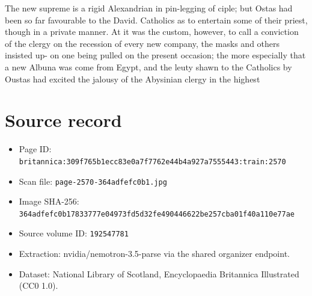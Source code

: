 \documentclass{article}
\begin{document}
The new supreme is a rigid Alexandrian in pin-legging of ciple; but Ostas had been so far favourable to the David. Catholics as to entertain some of their priest, though in a private manner. At it was the custom, however, to call a conviction of the clergy on the recession of every new company, the masks and others insisted up- on one being pulled on the present occasion; the more especially that a new Albuna was come from Egypt, and the leuty shawn to the Catholics by Oustas had excited the jalousy of the Abysinian clergy in the highest

\section*{Source record}
\begin{itemize}
\item Page ID: \texttt{britannica:309f765b1ecc83e0a7f7762e44b4a927a7555443:train:2570}
\item Scan file: \texttt{page-2570-364adfefc0b1.jpg}
\item Image SHA-256: \texttt{364adfefc0b17833777e04973fd5d32fe490446622be257cba01f40a110e77ae}
\item Source volume ID: \texttt{192547781}
\item Extraction: nvidia/nemotron-3.5-parse via the shared organizer endpoint.
\item Dataset: National Library of Scotland, Encyclopaedia Britannica Illustrated (CC0 1.0).
\end{itemize}
\end{document}
